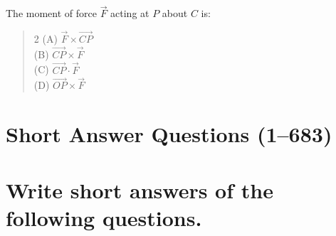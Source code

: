 \documentclass[11pt,a4paper]{article}
\begin{document}
\begin{mcqlist}
\item The moment of force $\vec{F}$ acting at $P$ about $C$ is:
\begin{quote}\begin{multicols}{2}
\noindent (A) $\vec{F}\times\overrightarrow{CP}$ \\
(B) $\overrightarrow{CP}\times\vec{F}$ \\
(C) $\overrightarrow{CP}\cdot\vec{F}$ \\
(D) $\overrightarrow{OP}\times\vec{F}$
\end{multicols}\end{quote}

\end{mcqlist}

\newpage

\section{Short Answer Questions (1--683)}

\section*{Write short answers of the following questions.}
\end{document}
